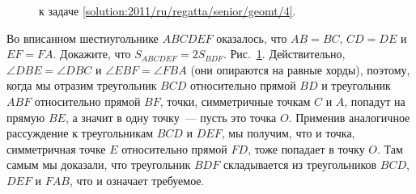 \ifsolution
\begin{figure}\centering
    \caption{к задаче \ref{solution:2011/ru/regatta/senior/geomt/4}.}
    \label{fig:solution:2011/ru/regatta/senior/geomt/4}
\end{figure}
\fi %

\problem
Во вписанном шестиугольнике $ABCDEF$ оказалось, что
$AB = BC$, $CD = DE$ и $EF = FA$.
Докажите, что $S_{ABCDEF} = 2 S_{BDF}$.
\solution
\label{solution:2011/ru/regatta/senior/geomt/4}%
Рис.~\ref{fig:solution:2011/ru/regatta/senior/geomt/4}.
Действительно, $\angle DBE = \angle DBC$ и $\angle EBF = \angle FBA$
(они опираются на равные хорды),
поэтому, когда мы отразим треугольник $BCD$ относительно прямой $BD$ и
треугольник $ABF$ относительно прямой $BF$, точки, симметричные точкам $C$ и
$A$, попадут на прямую $BE$, а значит в одну точку~--- пусть это точка $O$.
Применив аналогичное рассуждение к треугольникам $BCD$ и $DEF$, мы получим, что
и точка, симметричная точке $E$ относительно прямой $FD$, тоже попадает в точку
$O$.
Там самым мы доказали, что треугольник $BDF$ складывается из треугольников
$BCD$, $DEF$ и $FAB$, что и означает требуемое.
\endproblem
